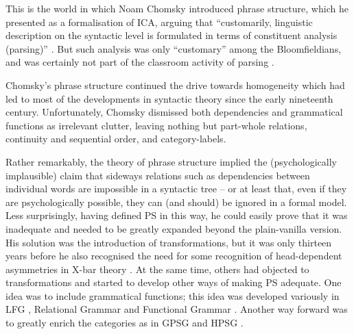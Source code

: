 \documentclass[output=paper]{langscibook}
\begin{document}
This is the world in which Noam Chomsky introduced phrase structure, which he presented as a formalisation of ICA, arguing that ``customarily, linguistic description on the syntactic level is formulated in terms of constituent analysis (parsing)'' \citep[26]{Chomsky57a}. But such analysis was only ``customary'' among the Bloomfieldians, and was certainly not part of the classroom activity of parsing \citep[147]{Matthews1993}.

Chomsky’s phrase structure continued the drive towards homogeneity which had led to most of the developments in syntactic theory since the early nineteenth century. Unfortunately, Chomsky dismissed both dependencies and grammatical functions as irrelevant clutter, leaving nothing but part-whole relations, continuity and sequential order, and category-labels.

Rather remarkably, the theory of phrase structure implied the (psychologically implausible) claim that sideways relations such as dependencies between individual words are impossible in a syntactic tree – or at least that, even if they are psychologically possible, they can (and should) be ignored in a formal model. Less surprisingly, having defined PS in this way, he could easily prove that it was inadequate and needed to be greatly expanded beyond the plain-vanilla version. His solution was the introduction of transformations, but it was only thirteen years before he also recognised the need for some recognition of head-dependent asymmetries in X-bar theory \citep{Chomsky70a}. At the same time, others had objected to transformations and started to develop other ways of making PS adequate. One idea was to include grammatical functions; this idea was developed variously in LFG \citep{Bresnan78a,Bresnan2001a}, Relational Grammar \citep{PP83a-u,Blake1990} and Functional Grammar \citep{Dik1989,Siewierska1991}. Another way forward was to greatly enrich the categories \citep{Harman63a} as in GPSG \citep{GKPS85a} and HPSG \citep{ps2}. 
\end{document}
